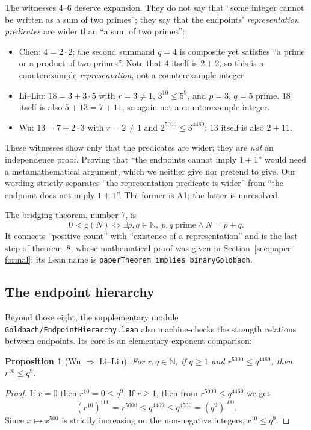 \documentclass[11pt,a4paper]{article}
\theoremstyle{plain}
\newtheorem{proposition}[theorem]{Proposition}
\theoremstyle{definition}
\newcommand{\gcount}{\mathrm{g}}
\newcommand{\N}{\mathbb{N}}
\begin{document}
The witnesses 4--6 deserve expansion. They do not say that ``some integer cannot be written as a sum of two primes''; they say that the endpoints' \emph{representation predicates} are wider than ``a sum of two primes'':

\begin{itemize}
\item Chen: $4=2\cdot2$; the second summand $q=4$ is composite yet satisfies ``a prime or a product of two primes''. Note that $4$ itself is $2+2$, so this is a counterexample \emph{representation}, not a counterexample integer.
\item Li--Liu: $18=3+3\cdot5$ with $r=3\ne1$, $3^{10}\le5^9$, and $p=3$, $q=5$ prime. $18$ itself is also $5+13=7+11$, so again not a counterexample integer.
\item Wu: $13=7+2\cdot3$ with $r=2\ne1$ and $2^{5000}\le3^{4469}$; $13$ itself is also $2+11$.
\end{itemize}

These witnesses show only that the predicates are wider; they are \emph{not} an independence proof. Proving that ``the endpoints cannot imply $1+1$'' would need a metamathematical argument, which we neither give nor pretend to give. Our wording strictly separates ``the representation predicate is wider'' from ``the endpoint does not imply $1+1$''. The former is A1; the latter is unresolved.

The bridging theorem, number 7, is
\begin{equation}
0<\gcount(N)\iff \exists p,q\in\N,\ p,q\ \text{prime}\land N=p+q.
\label{eq:bridge}
\end{equation}
It connects ``positive count'' with ``existence of a representation'' and is the last step of theorem~8, whose mathematical proof was given in Section~\ref{sec:paper-formal}; its Lean name is \texttt{paperTheorem\_implies\_binaryGoldbach}.

\subsection{The endpoint hierarchy}
\label{sec:hierarchy}

Beyond those eight, the supplementary module \texttt{Goldbach/EndpointHierarchy.lean} also machine-checks the strength relations between endpoints. Its core is an elementary exponent comparison:

\begin{proposition}[Wu $\Rightarrow$ Li--Liu]
\label{prop:wu-ll}
For $r,q\in\N$, if $q\ge1$ and $r^{5000}\le q^{4469}$, then $r^{10}\le q^{9}$.
\end{proposition}
\begin{proof}
If $r=0$ then $r^{10}=0\le q^9$. If $r\ge1$, then from $r^{5000}\le q^{4469}$ we get
\[
(r^{10})^{500}=r^{5000}\le q^{4469}\le q^{4500}=(q^9)^{500}.
\]
Since $x\mapsto x^{500}$ is strictly increasing on the non-negative integers, $r^{10}\le q^9$.
\end{proof}
\end{document}
